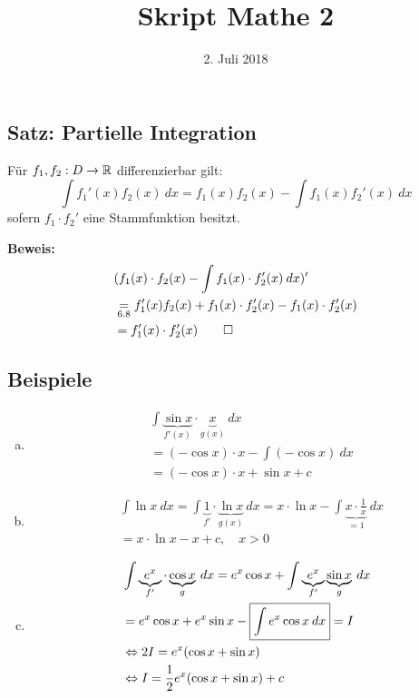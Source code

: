 \documentclass[10pt, a4paper, fleqn]{article}
\begin{document}
    \title{Skript Mathe 2}
    \date{2. Juli 2018}
    \maketitle
\fi
\subsection{Satz: Partielle Integration}
Für $f_1, f_2: D \to \mathbb{R}$ differenzierbar gilt:
\[
    \int f_1'(x) f_2(x) \:dx = f_1(x) f_2(x) - \int f_1(x) f_2'(x) \:dx    
\]
sofern $f_1 \cdot f_2'$ eine Stammfunktion besitzt.
\bigskip

\textbf{Beweis: }
\vspace{-5pt}
\[\begin{aligned}
    &(f_1(x) \cdot f_2(x) - \int f_1(x) \cdot f_2'(x) \:dx)' \\
    &\underset{6.8}{=} f_1'(x) f_2(x) + f_1(x) \cdot f_2'(x) - f_1(x) \cdot f_2'(x) \\ 
    &= f_1'(x) \cdot f_2'(x) \qed
\end{aligned}\]

\subsection{Beispiele}
\begin{enumerate}[a)]
    \abovedisplayskip = -\baselineskip

    \item \[\begin{aligned}
        &\int \underbrace{\sin x}_{f'(x)} \cdot \underbrace{x}_{g(x)} \:dx \\
        &= (-\cos x) \cdot x - \int (-\cos x) \:dx \\
        &= (-\cos x) \cdot x + \sin x + c
    \end{aligned}\]

    \item \[\begin{aligned}
        &\int \ln x \:dx = \int \underbrace{1}_{f'} \cdot \underbrace{\ln x}_{g(x)} \:dx 
        = x \cdot \ln x - \int \underbrace{x \cdot \frac{1}{x}}_{=1} \:dx \\
        &= x \cdot \ln x - x + c, \quad x > 0
    \end{aligned}\]

    \item \[\begin{aligned}
        &\int \underbrace{e^x}_{f'} \cdot \underbrace{\cos x}_{g} \:dx = e^x \cos x + 
            \int \underbrace{e^x}_{f'} \underbrace{\sin x}_{g} \:dx \\
        &= e^x \cos x + e^x \sin x - \boxed{\int e^x \cos x \:dx} = I \\
        &\Leftrightarrow 2I = e^x (\cos x + \sin x) \\
        &\Leftrightarrow I = \frac{1}{2} e^x (\cos x + \sin x) + c
    \end{aligned}\]
\end{enumerate}
\end{document}
